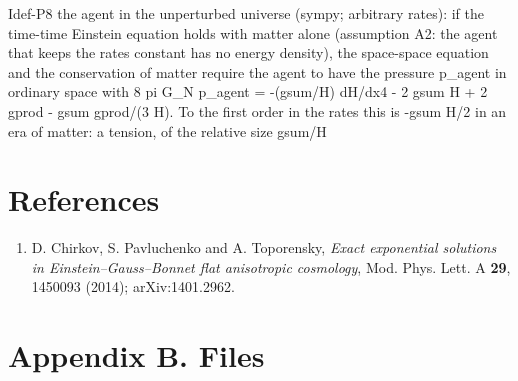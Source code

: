 \documentclass[
  10pt,
]{article}
\newenvironment{Shaded}{}{}
\newcommand{\NormalTok}[1]{#1}
\providecommand{\tightlist}{%
  \setlength{\itemsep}{0pt}\setlength{\parskip}{0pt}}
\begin{document}
\begin{Shaded}
\begin{Highlighting}[]
\NormalTok{[PASS] Idef{-}P8  the agent in the unperturbed universe (sympy; arbitrary rates): if the time{-}time Einstein equation holds with matter alone (assumption A2: the agent that keeps the rates constant has no energy density), the space{-}space equation and the conservation of matter require the agent to have the pressure p\_agent in ordinary space with 8 pi G\_N p\_agent = {-}(gsum/H) dH/dx4 {-} 2 gsum H + 2 gprod {-} gsum gprod/(3 H). To the first order in the rates this is {-}gsum H/2 in an era of matter: a tension, of the relative size gsum/H}
\end{Highlighting}
\end{Shaded}

\hypertarget{references}{%
\section{References}\label{references}}

\begin{enumerate}
\def\labelenumi{\arabic{enumi}.}
\tightlist
\item
  D. Chirkov, S. Pavluchenko and A. Toporensky, \emph{Exact exponential
  solutions in Einstein--Gauss--Bonnet flat anisotropic cosmology}, Mod.
  Phys. Lett. A \textbf{29}, 1450093 (2014); arXiv:1401.2962.
\end{enumerate}

\hypertarget{appendix-b.-files}{%
\section{Appendix B. Files}\label{appendix-b.-files}}
\end{document}
